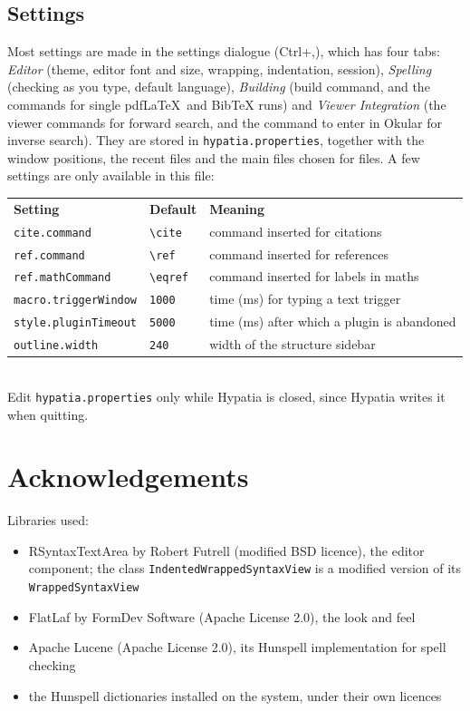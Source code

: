 \documentclass[11pt]{article}
\newcommand{\key}[1]{\textsf{#1}}
\newcommand{\file}[1]{\texttt{#1}}
\begin{document}
    \subsection{Settings}\label{sec:settings}

    Most settings are made in the settings dialogue (\key{Ctrl+,}), which has four tabs: \emph{Editor} (theme, editor font and size, wrapping, indentation, session), \emph{Spelling} (checking as you type, default language), \emph{Building} (build command, and the commands for single pdf\LaTeX\ and BibTeX runs) and \emph{Viewer Integration} (the viewer commands for forward search, and the command to enter in Okular for inverse search). They are stored in \file{hypatia.properties}, together with the window positions, the recent files and the main files chosen for files. A few settings are only available in this file:\\[2mm]
    \hspace*{1cm}\begin{tabular}{lll}
        \textbf{Setting} & \textbf{Default} & \textbf{Meaning}\\[1mm]
        \verb+cite.command+ & \verb+\cite+ & command inserted for citations\\
        \verb+ref.command+ & \verb+\ref+ & command inserted for references\\
        \verb+ref.mathCommand+ & \verb+\eqref+ & command inserted for labels in maths\\
        \verb+macro.triggerWindow+ & \verb+1000+ & time (ms) for typing a text trigger\\
        \verb+style.pluginTimeout+ & \verb+5000+ & time (ms) after which a plugin is abandoned\\
        \verb+outline.width+ & \verb+240+ & width of the structure sidebar
    \end{tabular}\\[2mm]
    Edit \file{hypatia.properties} only while Hypatia is closed, since Hypatia writes it when quitting.


    \section{Acknowledgements}

    Libraries used:
    \begin{itemize}
        \itemsep-1mm
        \item RSyntaxTextArea by Robert Futrell (modified BSD licence), the editor component; the class \verb+IndentedWrappedSyntaxView+ is a modified version of its \verb+WrappedSyntaxView+
        \item FlatLaf by FormDev Software (Apache License 2.0), the look and feel
        \item Apache Lucene (Apache License 2.0), its Hunspell implementation for spell checking
        \item the Hunspell dictionaries installed on the system, under their own licences
    \end{itemize}
\end{document}
